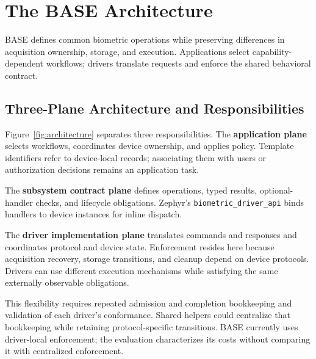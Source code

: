 \section{The BASE Architecture}
\label{sec:architecture}

BASE defines common biometric operations while preserving differences in acquisition ownership, storage, and execution. Applications select capability-dependent workflows; drivers translate requests and enforce the shared behavioral contract.

\subsection{Three-Plane Architecture and Responsibilities}

Figure~\ref{fig:architecture} separates three responsibilities. The \textbf{application plane} selects workflows, coordinates device ownership, and applies policy. Template identifiers refer to device-local records; associating them with users or authorization decisions remains an application task.

The \textbf{subsystem contract plane} defines operations, typed results, optional-handler checks, and lifecycle obligations. Zephyr's \texttt{biometric\_\allowbreak{}driver\_\allowbreak{}api} binds handlers to device instances for inline dispatch.

The \textbf{driver implementation plane} translates commands and responses and coordinates protocol and device state. Enforcement resides here because acquisition recovery, storage transitions, and cleanup depend on device protocols. Drivers can use different execution mechanisms while satisfying the same externally observable obligations.

This flexibility requires repeated admission and completion bookkeeping and validation of each driver's conformance. Shared helpers could centralize that bookkeeping while retaining protocol-specific transitions. BASE currently uses driver-local enforcement; the evaluation characterizes its costs without comparing it with centralized enforcement.

